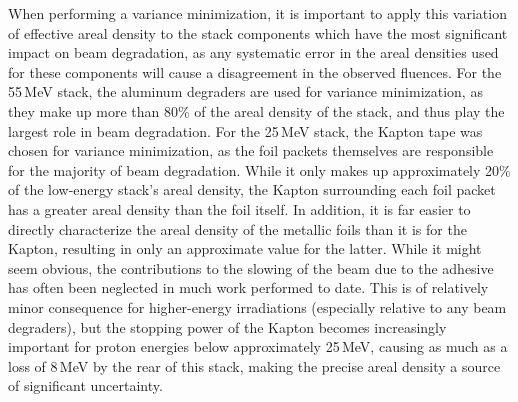 When performing  a variance minimization, it is important to apply this variation of effective areal density  to the stack components which  have the most significant impact on beam degradation, as any systematic error in the areal densities used for these components will cause a disagreement in the observed fluences.
For the 55\,MeV stack, the aluminum degraders are used for variance minimization, as they make up more than 80\% of the areal density of the stack, and thus play the largest role in beam degradation.
For the 25\,MeV stack, the Kapton tape was chosen for variance minimization, as the foil packets themselves are responsible for the majority of beam degradation.
While it only makes up approximately 20\% of the low-energy stack's areal density, the Kapton surrounding each foil packet has a greater areal density than the foil itself.
In addition, it is far easier to directly characterize the areal density of the metallic foils than it is for the Kapton, resulting in only an approximate value for the latter.
While it might seem obvious, the contributions to the slowing of the beam due to the adhesive has often been neglected in much work performed to date. 
This is of relatively minor consequence for higher-energy irradiations (especially relative to any beam degraders), but the stopping power of the Kapton becomes increasingly important for proton energies below approximately 25\,MeV, causing as much as a loss of 8\,MeV by the rear of this stack, making the precise areal density a source of significant uncertainty.






